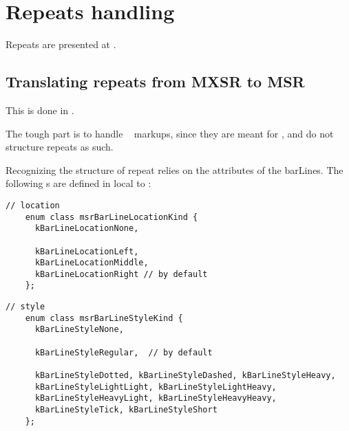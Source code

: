 



\chapter{Repeats handling}\label{Repeats handling}

Repeats are presented at .


\section{Translating repeats from MXSR to MSR}

This is done in \mxsrToMsr{}.

The tough part is to handle \mxml\  markups, since they are meant for \drawing, and do not structure repeats as such.

Recognizing the structure of repeat relies on the attributes of the barLines. The following \enumType s are defined in  local to :
\begin{lstlisting}[language=CPlusPlus]
    // location
    enum class msrBarLineLocationKind {
      kBarLineLocationNone,

      kBarLineLocationLeft,
      kBarLineLocationMiddle,
      kBarLineLocationRight // by default
    };
\end{lstlisting}

\begin{lstlisting}[language=CPlusPlus]
    // style
    enum class msrBarLineStyleKind {
      kBarLineStyleNone,

      kBarLineStyleRegular,  // by default

      kBarLineStyleDotted, kBarLineStyleDashed, kBarLineStyleHeavy,
      kBarLineStyleLightLight, kBarLineStyleLightHeavy,
      kBarLineStyleHeavyLight, kBarLineStyleHeavyHeavy,
      kBarLineStyleTick, kBarLineStyleShort
    };
\end{lstlisting}

